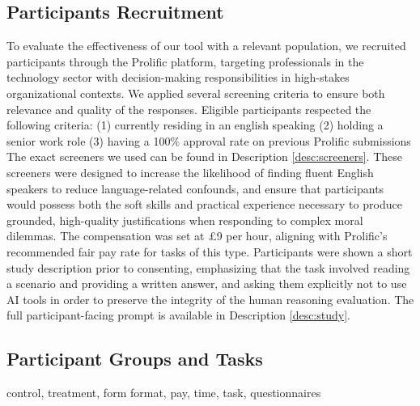 \subsection{Participants Recruitment}

To evaluate the effectiveness of our tool with a relevant population, we recruited participants through the Prolific platform, targeting professionals in the technology sector with decision-making responsibilities in high-stakes organizational contexts.
We applied several screening criteria to ensure both relevance and quality of the responses. Eligible participants respected the following criteria:
(1) currently residing in an english speaking
(2) holding a senior work role
(3) having a 100\% approval rate on previous Prolific submissions
The exact screeners we used can be found in Description \ref{desc:screeners}.
These screeners were designed to increase the likelihood of finding fluent English speakers to reduce language-related confounds, and ensure that participants would possess both the soft skills and practical experience necessary to produce grounded, high-quality justifications when responding to complex moral dilemmas.
The compensation was set at £9 per hour, aligning with Prolific's recommended fair pay rate for tasks of this type.
Participants were shown a short study description prior to consenting, emphasizing that the task involved reading a scenario and providing a written answer, and asking them explicitly not to use AI tools in order to preserve the integrity of the human reasoning evaluation. The full participant-facing prompt is available in Description \ref{desc:study}.

\subsection{Participant Groups and Tasks}
control, treatment, form format, pay, time, task, questionnaires
